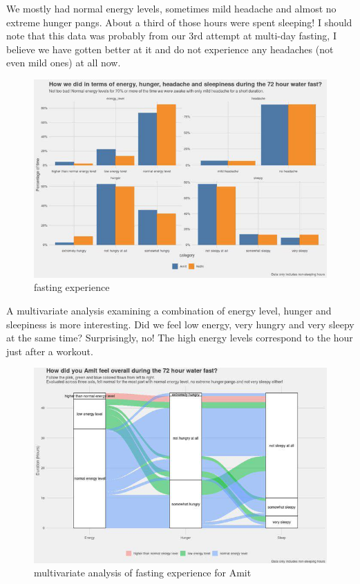 \documentclass[
  oneside]{book}
\begin{document}
We mostly had normal energy levels, sometimes mild headache and almost no extreme hunger pangs. About a third of those hours were spent sleeping! I should note that this data was probably from our 3rd attempt at multi-day fasting, I believe we have gotten better at it and do not experience any headaches (not even mild ones) at all now.

\begin{figure}
\centering
\includegraphics{pictures/fasting1.jpeg}
\caption{fasting experience}
\end{figure}

A multivariate analysis examining a combination of energy level, hunger and sleepiness is more interesting. Did we feel low energy, very hungry and very sleepy at the same time? Surprisingly, no! The high energy levels correspond to the hour just after a workout.

\begin{figure}
\centering
\includegraphics{pictures/fasting2.jpeg}
\caption{multivariate analysis of fasting experience for Amit}
\end{figure}
\end{document}
